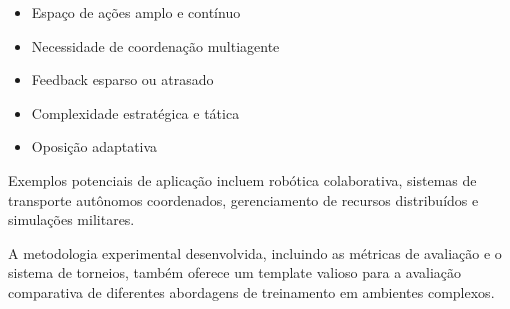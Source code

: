 \begin{itemize}
    \item Espaço de ações amplo e contínuo
    \item Necessidade de coordenação multiagente
    \item Feedback esparso ou atrasado
    \item Complexidade estratégica e tática
    \item Oposição adaptativa
\end{itemize}

Exemplos potenciais de aplicação incluem robótica colaborativa, sistemas de transporte autônomos coordenados, gerenciamento de recursos distribuídos e simulações militares.

A metodologia experimental desenvolvida, incluindo as métricas de avaliação e o sistema de torneios, também oferece um template valioso para a avaliação comparativa de diferentes abordagens de treinamento em ambientes complexos. 